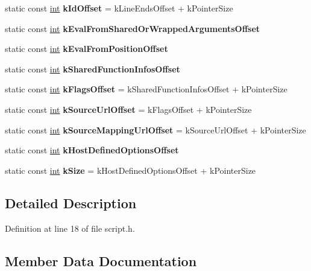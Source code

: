 \begin{DoxyCompactItemize}
static const \mbox{\hyperlink{classint}{int}} {\bfseries k\+Id\+Offset} = k\+Line\+Ends\+Offset + k\+Pointer\+Size
\item 
static const \mbox{\hyperlink{classint}{int}} {\bfseries k\+Eval\+From\+Shared\+Or\+Wrapped\+Arguments\+Offset}
\item 
static const \mbox{\hyperlink{classint}{int}} {\bfseries k\+Eval\+From\+Position\+Offset}
\item 
static const \mbox{\hyperlink{classint}{int}} {\bfseries k\+Shared\+Function\+Infos\+Offset}
\item 
\mbox{\label{classv8_1_1internal_1_1Script_a885bc782f8dc8c358d4aae4a72b97e9b}} 
static const \mbox{\hyperlink{classint}{int}} {\bfseries k\+Flags\+Offset} = k\+Shared\+Function\+Infos\+Offset + k\+Pointer\+Size
\item 
\mbox{\label{classv8_1_1internal_1_1Script_a7568c12789b46731e2189037d7b41841}} 
static const \mbox{\hyperlink{classint}{int}} {\bfseries k\+Source\+Url\+Offset} = k\+Flags\+Offset + k\+Pointer\+Size
\item 
\mbox{\label{classv8_1_1internal_1_1Script_a23d5b6efceed60bc940db2870f4d8ebd}} 
static const \mbox{\hyperlink{classint}{int}} {\bfseries k\+Source\+Mapping\+Url\+Offset} = k\+Source\+Url\+Offset + k\+Pointer\+Size
\item 
static const \mbox{\hyperlink{classint}{int}} {\bfseries k\+Host\+Defined\+Options\+Offset}
\item 
\mbox{\label{classv8_1_1internal_1_1Script_a80d31769a7f5c7901ff3a9534b4fcae3}} 
static const \mbox{\hyperlink{classint}{int}} {\bfseries k\+Size} = k\+Host\+Defined\+Options\+Offset + k\+Pointer\+Size
\end{DoxyCompactItemize}


\subsection{Detailed Description}


Definition at line 18 of file script.\+h.



\subsection{Member Data Documentation}
\mbox{\label{classv8_1_1internal_1_1Script_a3f7d8c82e78cb32d8d9e891527a94148}} 
